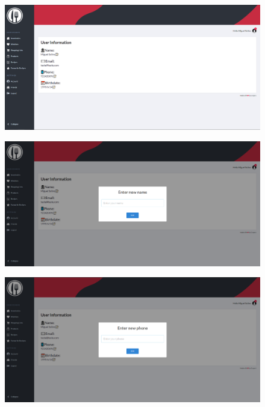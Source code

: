 \documentclass[a4paper]{report}
\begin{document}
    \begin{figure}[H]
        \centering
            \includegraphics[width=\textwidth]{images/produto_final/pagina_de_perfil.png}
    \end{figure}

    \begin{figure}[H]
        \centering
            \includegraphics[width=\textwidth]{images/produto_final/alterar_nome_perfil.png}
    \end{figure}

    \begin{figure}[H]
        \centering
            \includegraphics[width=\textwidth]{images/produto_final/alterar_numero_perfil.png}
    \end{figure}
\end{document}
